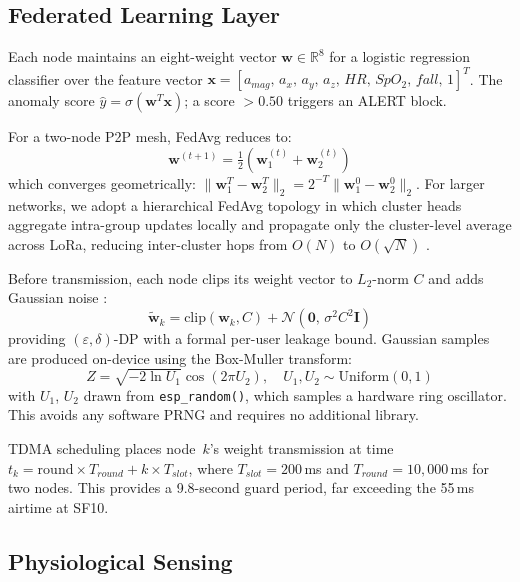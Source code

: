 \documentclass[journal]{IEEEtran}
\begin{document}
\subsection{Federated Learning Layer}

Each node maintains an eight-weight vector
$\mathbf{w} \in \mathbb{R}^8$ for a logistic regression classifier over
the feature vector
$\mathbf{x} = [a_{mag},\,a_x,\,a_y,\,a_z,\,HR,\,SpO_2,\,fall,\,1]^T$.
The anomaly score $\hat{y} = \sigma(\mathbf{w}^T\mathbf{x})$; a score
$> 0.50$ triggers an ALERT block.

For a two-node P2P mesh, FedAvg reduces to:
\begin{equation}
\mathbf{w}^{(t+1)} = \tfrac{1}{2}\!\left(\mathbf{w}_1^{(t)} +
\mathbf{w}_2^{(t)}\right)
\label{eq:fedavg}
\end{equation}
which converges geometrically: $\|\mathbf{w}_1^T - \mathbf{w}_2^T\|_2 =
2^{-T}\|\mathbf{w}_1^0 - \mathbf{w}_2^0\|_2$. For larger networks, we
adopt a hierarchical FedAvg topology in which cluster heads aggregate
intra-group updates locally and propagate only the cluster-level average
across LoRa, reducing inter-cluster hops from $O(N)$ to $O(\sqrt{N})$
\cite{Konecny2016}.

Before transmission, each node clips its weight vector to $L_2$-norm $C$
and adds Gaussian noise \cite{Abadi2016, Dwork2006}:
\begin{equation}
\tilde{\mathbf{w}}_k = \text{clip}(\mathbf{w}_k, C) +
\mathcal{N}\!\left(\mathbf{0},\,\sigma^2 C^2 \mathbf{I}\right)
\label{eq:dp}
\end{equation}
providing $(\varepsilon,\delta)$-DP with a formal per-user leakage bound.
Gaussian samples are produced on-device using the Box-Muller transform:
\begin{equation}
Z = \sqrt{-2\ln U_1}\cos(2\pi U_2), \quad
U_1, U_2 \sim \text{Uniform}(0,1)
\label{eq:bm}
\end{equation}
with $U_1$, $U_2$ drawn from \texttt{esp\_random()}, which samples a
hardware ring oscillator. This avoids any software PRNG and requires no
additional library.

TDMA scheduling places node~$k$'s weight transmission at time
$t_k = \text{round} \times T_{round} + k \times T_{slot}$, where
$T_{slot} = 200$\,ms and $T_{round} = 10{,}000$\,ms for two nodes.
This provides a 9.8-second guard period, far exceeding the 55\,ms
airtime at SF10.

\subsection{Physiological Sensing}
\end{document}
